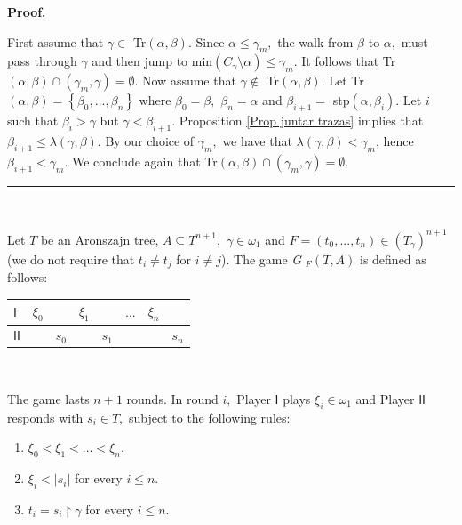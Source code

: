 \documentclass{article}
\newenvironment{proof}[1][Proof]{\noindent\textbf{#1.} }{\ \rule{0.5em}{0.5em}}
\begin{document}
\begin{proof}
\qquad\qquad\ \ 

First assume that $\gamma\in$ \textsf{Tr}$(\alpha,\beta).$ Since $\alpha
\leq\gamma_{m},$ the walk from $\beta$ to $\alpha,$ must pass through $\gamma$
and then jump to \textsf{min}$\left(  C_{\gamma}\setminus\alpha\right)
\leq\gamma_{m}.$ It follows that \textsf{Tr}$(\alpha,\beta)\cap\left(
\gamma_{m},\gamma\right)  =\emptyset$. Now assume that $\gamma\notin$
\textsf{Tr}$(\alpha,\beta).$ Let \textsf{Tr}$\left(  \alpha,\beta\right)
=\left\{  \beta_{0},...,\beta_{n}\right\}  $ where $\beta_{0}=\beta,$
$\beta_{n}=\alpha$ and $\beta_{i+1}=$ \textsf{stp}$\left(  \alpha,\beta
_{i}\right)  .$ Let $i$ such that $\beta_{i}>\gamma$ but $\gamma<\beta_{i+1}.$
Proposition \ref{Prop juntar trazas} implies that $\beta_{i+1}\leq
\lambda\left(  \gamma,\beta\right)  .$ By our choice of $\gamma_{m},$ we have
that $\lambda\left(  \gamma,\beta\right)  <\gamma_{m}$, hence $\beta
_{i+1}<\gamma_{m}.$ We conclude again that \textsf{Tr}$(\alpha,\beta
)\cap\left(  \gamma_{m},\gamma\right)  =\emptyset$.
\end{proof}

\qquad\ \qquad\ \qquad\ \ \ \ \ \qquad\ \ 

Let $T$ be an Aronszajn tree, $A\subseteq T^{n+1},$ $\gamma\in\omega_{1}$ and
$F=\left(  t_{0},...,t_{n}\right)  \in\left(  T_{\gamma}\right)  ^{n+1}$ (we
do not require that $t_{i}\neq t_{j}$ for $i\neq j$). The game \emph{G}%
$_{F}\left(  T,A\right)  $ is defined as follows:

\begin{center}%
\begin{tabular}
[c]{|l|l|l|l|l|l|l|l|}\hline
$\mathsf{I}$ & $\xi_{0}$ &  & $\xi_{1}$ &  & $...$ & $\xi_{n}$ & \\\hline
$\mathsf{II}$ &  & $s_{0}$ &  & $s_{1}$ &  &  & $s_{n}$\\\hline
\end{tabular}



\end{center}

\qquad\ \qquad\ \ \qquad\ \ 

The game lasts $n+1$ rounds. In round $i,$ Player $\mathsf{I}$ plays $\xi
_{i}\in\omega_{1}$ and Player $\mathsf{II}$ responds with $s_{i}\in T,$
subject to the following rules:

\begin{enumerate}
\item $\xi_{0}<\xi_{1}<...<\xi_{n}.$

\item $\xi_{i}<\left\vert s_{i}\right\vert $ for every $i\leq n.$

\item $t_{i}=s_{i}\upharpoonright\gamma$ for every $i\leq n.$
\end{enumerate}
\end{document}
